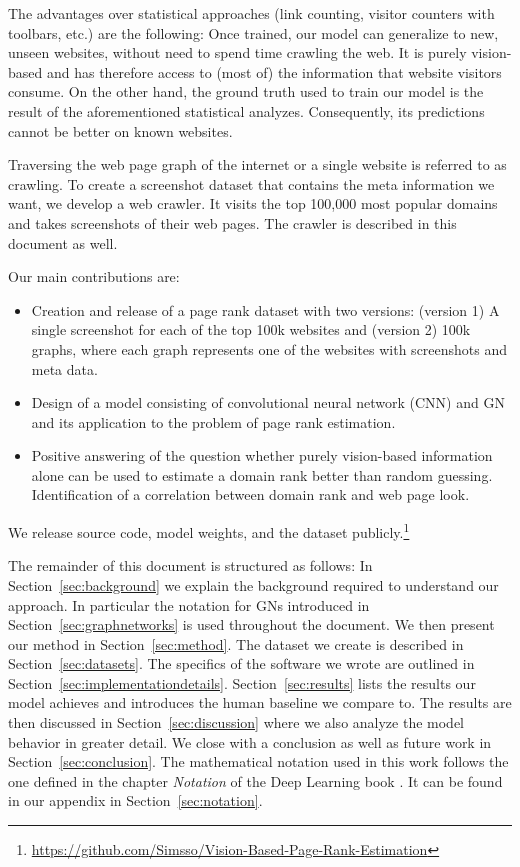 The advantages over statistical approaches (link counting, visitor counters with toolbars, etc.) are the following: Once trained, our model can generalize to new, unseen websites, without need to spend time crawling the web. It is purely vision-based and has therefore access to (most of) the information that website visitors consume. On the other hand, the ground truth used to train our model is the result of the aforementioned statistical analyzes. Consequently, its  predictions cannot be better on known websites.

Traversing the web page graph of the internet or a single website is referred to as crawling. To create a screenshot dataset that contains the meta information we want, we develop a web crawler. It visits the top 100,000 most popular domains and takes screenshots of their web pages. The crawler is described in this document as well.

Our main contributions are:
\begin{itemize}
\item Creation and release of a page rank dataset with two versions: (version 1) A single screenshot for each of the top 100k websites and (version 2) 100k graphs, where each graph represents one of the websites with screenshots and meta data.
\item Design of a model consisting of convolutional neural network (CNN) and GN and its application to the problem of page rank estimation.
\item Positive answering of the question whether purely vision-based information alone can be used to estimate a domain rank better than random guessing. Identification of a correlation between domain rank and web page look.
\end{itemize}

We release source code, model weights, and the dataset publicly.\footnote{\url{https://github.com/Simsso/Vision-Based-Page-Rank-Estimation}}


The remainder of this document is structured as follows: In Section~\ref{sec:background} we explain the background required to understand our approach. In particular the notation for GNs introduced in Section~\ref{sec:graphnetworks} is used throughout the document. We then present our method in Section~\ref{sec:method}. The dataset we create is described in Section~\ref{sec:datasets}. The specifics of the software we wrote are outlined in Section~\ref{sec:implementationdetails}. Section~\ref{sec:results} lists the results our model achieves and introduces the human baseline we compare to. The results are then discussed in Section~\ref{sec:discussion} where we also analyze the model behavior in greater detail. We close with a conclusion as well as future work in Section~\ref{sec:conclusion}. The mathematical notation used in this work follows the one defined in the chapter \textit{Notation} of the Deep Learning book \cite{goodfellow:dlbook}. It can be found in our appendix in Section~\ref{sec:notation}.
